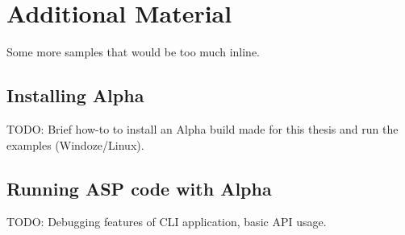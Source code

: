 \chapter{Additional Material}

Some more samples that would be too much inline. 

\section{Installing Alpha}

TODO: Brief how-to to install an Alpha build made for this thesis and run the examples (Windoze/Linux).

\section{Running ASP code with Alpha}

TODO: Debugging features of CLI application, basic API usage.

